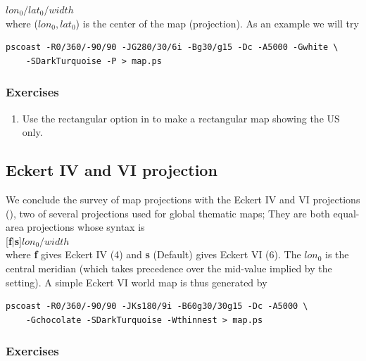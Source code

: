 \documentclass{report}
\begin{document}
$lon_0/lat_0/width$ \\

\noindent
where ($lon_0, lat_0$) is the center of the map (projection).
As an example we will try

{\small\begin{verbatim}
pscoast -R0/360/-90/90 -JG280/30/6i -Bg30/g15 -Dc -A5000 -Gwhite \
    -SDarkTurquoise -P > map.ps
\end{verbatim}
}

\subsubsection{Exercises}

\begin{enumerate}

\item Use the rectangular option in  to make a rectangular map
showing the US only.

\end{enumerate}

\subsection{Eckert IV and VI projection}

We conclude the survey of map projections with the Eckert IV and VI projections
(\Opt{JK}), two of several projections used for global thematic maps; They
are both equal-area projections whose syntax is \\

[{\bf f$|$s}]$lon_0/width$ \\

\noindent
where {\bf f} gives Eckert IV (4) and {\bf s} (Default) gives Eckert VI (6).
The $lon_0$ is the central meridian (which takes precedence over
the mid-value implied by the \Opt{R} setting).  A simple Eckert VI world map
is thus generated by

{\small\begin{verbatim}
pscoast -R0/360/-90/90 -JKs180/9i -B60g30/30g15 -Dc -A5000 \
    -Gchocolate -SDarkTurquoise -Wthinnest > map.ps
\end{verbatim}
}

\subsubsection{Exercises}
\end{document}

